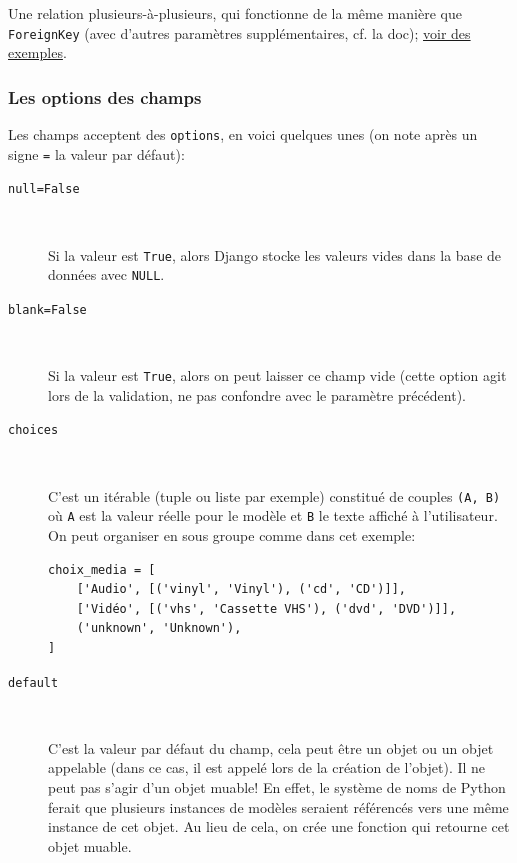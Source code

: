 \documentclass[a4paper, 10pt]{article}
\begin{document}
{\begin{description}
	      Une relation plusieurs-à-plusieurs, qui fonctionne de la même manière que \texttt{ForeignKey} (avec d'autres paramètres supplémentaires, cf. la doc); \href{https://docs.djangoproject.com/fr/2.0/topics/db/examples/many_to_many/}{voir des exemples}.
\end{description}

\subsubsection{Les options des champs}
Les champs acceptent des \texttt{options}, en voici quelques unes (on note après un signe \texttt{=} la valeur par défaut):
\begin{description}
	\item[\texttt{null=False}]~

	      Si la valeur est \texttt{True}, alors Django stocke les valeurs vides dans la base de données avec \texttt{NULL}.

	\item[\texttt{blank=False}]~

	      Si la valeur est \texttt{True}, alors on peut laisser ce champ vide (cette option agit lors de la validation, ne pas confondre avec le paramètre précédent).

	\item[\texttt{choices}]~

	      C'est un itérable (tuple ou liste par exemple) constitué de couples \texttt{(A, B)} où \texttt{A} est la valeur réelle pour le modèle et \texttt{B} le texte affiché à l'utilisateur. On peut organiser en sous groupe comme dans cet exemple:

	      \begin{verbatim}
choix_media = [
    ['Audio', [('vinyl', 'Vinyl'), ('cd', 'CD')]],
    ['Vidéo', [('vhs', 'Cassette VHS'), ('dvd', 'DVD')]],
    ('unknown', 'Unknown'),
]
    \end{verbatim}

	\item[\texttt{default}]~

	      C'est la valeur par défaut du champ, cela peut être un objet ou un objet appelable (dans ce cas, il est appelé lors de la création de l'objet). Il ne peut pas s'agir d'un objet muable! En effet, le système de noms de Python ferait que plusieurs instances de modèles seraient référencés vers une même instance de cet objet. Au lieu de cela, on crée une fonction qui retourne cet objet muable.


\end{description}}
\end{document}
